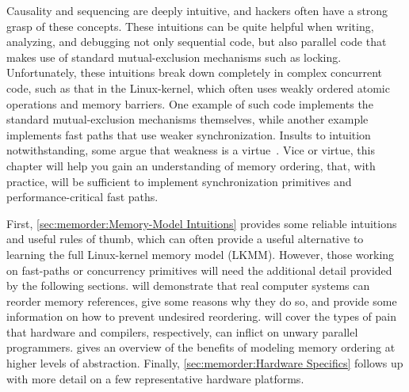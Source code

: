 
%

Causality and sequencing are deeply intuitive, and hackers often
have a strong grasp of these concepts.
These intuitions can be quite helpful when writing, analyzing, and
debugging not only sequential code, but also parallel code that makes
use of standard mutual-exclusion mechanisms such as locking.
Unfortunately, these intuitions break down completely in complex
concurrent code, such as that in  the Linux-kernel, which often uses
weakly ordered atomic operations and memory barriers.
One example of such code implements the standard mutual-exclusion
mechanisms themselves, while another example implements fast
paths that use weaker synchronization.
Insults to intuition notwithstanding, some argue that weakness is a
virtue~\cite{JadeAlglave2013-WeaknessIsVirtue}.
Vice or virtue, this chapter will help you gain an understanding of
memory ordering, that, with practice, will be sufficient to implement
synchronization primitives and performance-critical fast paths.

First, \cref{sec:memorder:Memory-Model Intuitions}
provides some reliable intuitions and useful rules of thumb, which can
often provide a useful alternative to learning the full Linux-kernel
memory model (LKMM)\@.
However, those working on fast-paths or concurrency primitives will
need the additional detail provided by the following sections.
will demonstrate that real computer systems can reorder memory references,
give some reasons why they do so, and provide some information on how
to prevent undesired reordering.
will cover the types of pain that hardware and compilers, respectively,
can inflict on unwary parallel programmers.
gives an overview of the benefits of modeling memory ordering at
higher levels of abstraction.
Finally,
\cref{sec:memorder:Hardware Specifics}
follows up with more detail on a few representative hardware platforms.

